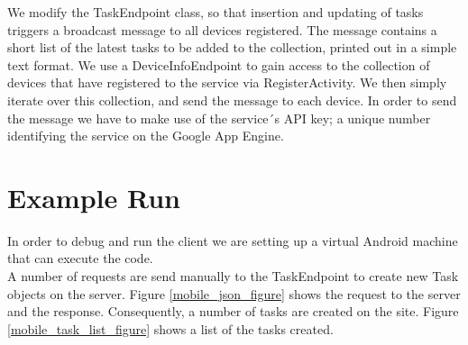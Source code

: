 We modify the TaskEndpoint class, so that insertion and updating of tasks triggers a broadcast message to all devices registered. The message contains a short list of the latest tasks to be added to the collection, printed out in a simple text format. We use a DeviceInfoEndpoint to gain access to the collection of devices that have registered to the service via RegisterActivity. We then simply iterate over this collection, and send the message to each device. In order to send the message we have to make use of the service´s API key; a unique number identifying the service on the Google App Engine. 

\pagebreak

\section{Example Run}
In order to debug and run the client we are setting up a virtual Android machine that can execute the code.\\

A number of requests are send manually to the TaskEndpoint to create new Task objects on the server. Figure \ref{mobile_json_figure} shows the request to the server and the response. Consequently, a number of tasks are created on the site. Figure \ref{mobile_task_list_figure} shows a list of the tasks created.\\

